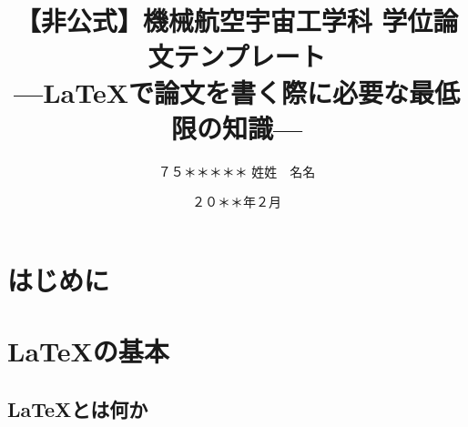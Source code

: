 \documentclass[
    paper=a4paper,      %
    report,             %
    fleqn,              %
    fontsize=12pt,      %
    jafontsize=12pt,    %
    head_space=33mm,    %
    foot_space=30mm,    %
    gutter=25mm,        %
    fore-edge=10mm      %
    ]{jlreq}            %
\begin{document}


\title{【非公式】機械航空宇宙工学科 学位論文テンプレート\\ ---\LaTeX で論文を書く際に必要な最低限の知識---}

\date{２０＊＊年２月}




\author{%
７５＊＊＊＊＊
\zw%
姓姓　名名
} %

\makecover

\pagestyle{empty}
\def\thepage{}
\tableofcontents

\signary

\lipsum[1-10]


\clearpage
\pagestyle{normal}
\setcounter{page}{0}

\chapter{はじめに}
\label{ch:introduction}



\chapter{\LaTeX の基本}
\label{ch:basic}

\lipsum[1]

\section{\LaTeX とは何か}
\label{sec:whatislatex}
\end{document}
